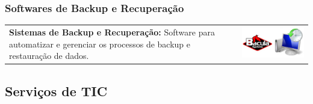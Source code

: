 \documentclass[
]{book}
\begin{document}
\subsubsection{Softwares de Backup e Recuperação}\label{softwares-de-backup-e-recuperauxe7uxe3o}

\begin{longtable}[]{@{}
  >{\centering\arraybackslash}p{}
  >{\raggedright\arraybackslash}p{}@{}}
\toprule\noalign{}
\endhead
\bottomrule\noalign{}
\endlastfoot
\textbf{Sistemas de Backup e Recuperação:} Software para automatizar e gerenciar os processos de backup e restauração de dados. & \includegraphics{images/InfraEstrutura/backup/backup.jpg} \\
\end{longtable}

\subsection{Serviços de TIC}\label{serviuxe7os-de-tic}
\end{document}
